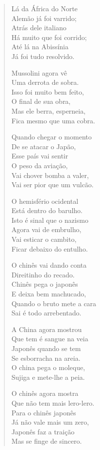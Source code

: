 \begin{verse}
Lá da África do Norte\\
Alemão já foi varrido;\\
Atrás dele italiano\\
Há muito que foi corrido;\\
Até lá na Abissínia\\
Já foi tudo resolvido.

Mussolini agora vê\\
Uma derrota de sobra.\\
Isso foi muito bem feito,\\
O final de sua obra,\\
Mas ele berra, esperneia,\\
Fica mesmo que uma cobra.

Quando chegar o momento\\
De se atacar o Japão,\\
Esse país vai sentir\\
O peso da aviação,\\
Vai chover bomba a valer,\\
Vai ser pior que um vulcão.

O hemisfério ocidental\\
Está dentro do barulho.\\
Isto é sinal que o nazismo\\
Agora vai de embrulho,\\
Vai esticar o cambito,\\
Ficar debaixo do entulho.


O chinês vai dando conta\\
Direitinho do recado.\\
Chinês pega o japonês\\
E deixa bem machucado,\\
Quando o bruto mete a cara\\
Sai é todo arrebentado.

A China agora mostrou\\
Que tem é sangue na veia\\
Japonês quando se tem\\
Se esborracha na areia.\\
O china pega o moleque,\\
Sujiga e mete-lhe a peia.

O chinês agora mostra\\
Que não tem mais lero-lero.\\
Para o chinês japonês\\
Já não vale mais um zero,\\
Japonês faz a traição\\
Mas se finge de sincero.


\end{verse}
